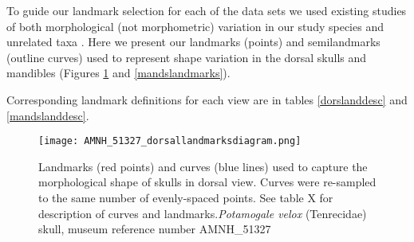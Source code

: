 \documentclass[12pt,a4paper]{article}
\begin{document}
To guide our landmark selection for each of the data sets we used existing studies of both morphological (not morphometric) variation in our study species \citep{Asher1999, Asher2008, Asher2010} and unrelated taxa \citep[e.g.][]{Barrow2008, Panchetti2008, Macholan2008, Klenovsek2013}. 
Here we present our landmarks (points) and semilandmarks (outline curves) used to represent shape variation in the dorsal skulls and mandibles (Figures \ref{dorslandmarks} and \ref{mandslandmarks}).

Corresponding landmark definitions for each view are in tables \ref{dorslanddesc} and \ref{mandslanddesc}.


\begin{figure}[H]
\centering
\texttt{[image: AMNH\_51327\_dorsallandmarksdiagram.png]}
\caption{Landmarks (red points) and curves (blue lines) used to capture the morphological shape of skulls in dorsal view. Curves were re-sampled to the same number of evenly-spaced points. See table X for description of curves and landmarks.\textit{Potamogale velox} (Tenrecidae) skull, museum reference number AMNH\_51327}
\label{dorslandmarks}
\end{figure}


\end{document}
